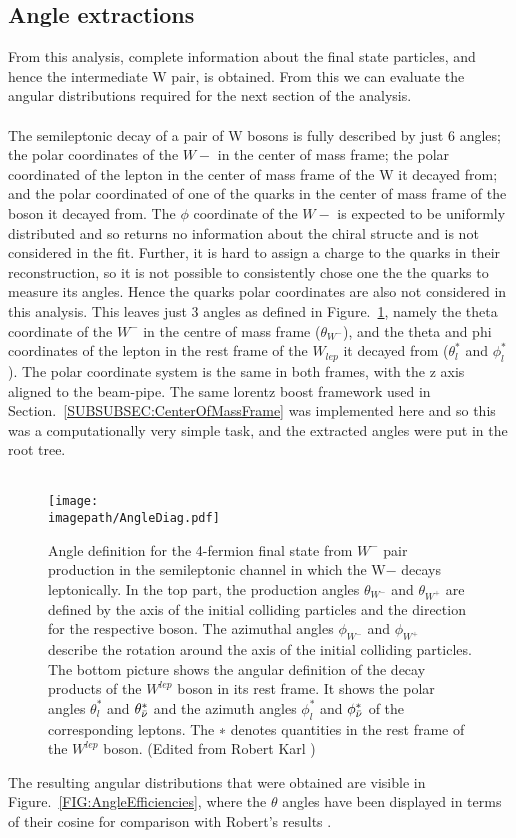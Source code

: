 \subsection{Angle extractions}
\label{SUBSEC:AngleExtractions}
From this analysis, complete information about the final state particles, and hence the intermediate W pair, is obtained. From this we can evaluate the angular distributions required for the next section of the analysis.
\\\\
The semileptonic decay of a pair of W bosons is fully described by just 6 angles; the polar coordinates of the ${W}{-}$ in the center of mass frame; the polar coordinated of the lepton in the center of mass frame of the W it decayed from; and the polar coordinated of one of the quarks in the center of mass frame of the boson it decayed from. The $\phi$ coordinate of the ${W}{-}$ is expected to be uniformly distributed and so returns no information about the chiral structe and is not considered in the fit. Further, it is hard to assign a charge to the quarks in their reconstruction, so it is not possible to consistently chose one the the quarks to measure its angles. Hence the quarks polar coordinates are also not considered in this analysis. This leaves just 3 angles as defined in Figure.~\ref{FIG:Angles}, namely the theta coordinate of the ${W}^{-}$ in the centre of mass frame (${\theta}_{{W}^{-}}$), and the theta and phi coordinates of the lepton in the rest frame of the ${W}_{lep}$ it decayed from (${\theta}_{l}^{*}$ and ${\phi}_{l}^{*}$). The polar coordinate system is the same in both frames, with the z axis aligned to the beam-pipe. The same lorentz boost framework used in Section.~\ref{SUBSUBSEC:CenterOfMassFrame} was implemented here and so this was a computationally very simple task, and the extracted angles were put in the root tree.
\\\\
\begin{figure}
    \texttt{[image: \\imagepath/AngleDiag.pdf]}
    \caption{
    Angle definition for the 4-fermion final state from ${W}^{-}$ pair production in the semileptonic channel in which the W− decays leptonically. In the top part, the production angles ${\theta}_{{W}^{-}}$ and ${\theta}_{{W}^{+}}$ are defined by the axis of the initial colliding particles and the direction for the respective boson. The azimuthal angles ${\phi}_{{W}^{-}}$ and ${\phi}_{{W}^{+}}$ describe the rotation around the axis of the initial colliding particles.\\
    The bottom picture shows the angular definition of the decay products of the ${W}^{lep}$ boson in its rest frame. It shows the polar angles ${\theta}_{l}^{*}$ and ${\theta}_{\bar{\nu}}^{*}$ and the azimuth angles ${\phi}_{l}^{*}$ and ${\phi}_{\bar{\nu}}^{*}$ of the corresponding leptons. The ∗ denotes quantities in the rest frame of the ${W}^{lep}$ boson. (Edited from Robert Karl \cite{RobertKarl})
      }
    \label{FIG:Angles}
\end{figure}
The resulting angular distributions that were obtained are visible in Figure.~\ref{FIG:AngleEfficiencies}, where the $\theta$ angles have been displayed in terms of their cosine for comparison with Robert’s results \cite{RobertKarl}.

